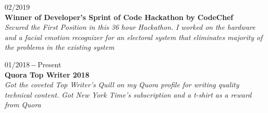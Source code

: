 \documentclass[a4paper, 12pt]{article}
\begin{document}
    \begin{flushleft}
        02/2019\\
        \textbf{Winner of Developer's Sprint of Code Hackathon by CodeChef}\\\textit{Secured the First Position in this 36 hour Hackathon. I worked on the hardware and a facial emotion recognizer for an electoral system that eliminates majority of the problems in the existing system}
    \end{flushleft}
    
    \begin{flushleft}
        01/2018\,$-$\,Present\\
        \textbf{Quora Top Writer 2018}\\\textit{Got the coveted Top Writer's Quill on my Quora profile for writing quality technical content. Got New York Time's subscription and a t-shirt as a reward from Quora}
    \end{flushleft}
    
    \pagebreak
    
\end{document}
